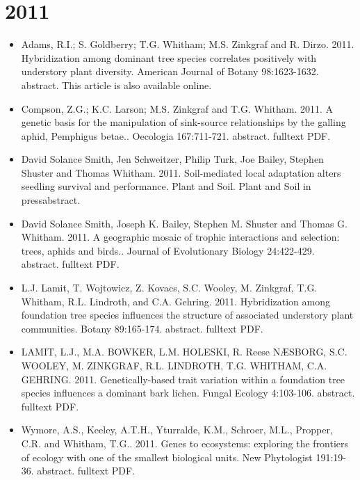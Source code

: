 \documentclass[12pt]{article}
\begin{document}
\section{2011}
\begin{itemize}
\item Adams, R.I.; S. Goldberry; T.G. Whitham; M.S. Zinkgraf and
R. Dirzo. 2011. Hybridization among dominant tree species correlates
positively with understory plant diversity. American Journal of Botany
98:1623-1632. abstract. This article is also available online.

\item Compson, Z.G.; K.C. Larson; M.S. Zinkgraf and T.G. Whitham. 2011. A
genetic basis for the manipulation of sink-source relationships by the
galling aphid, Pemphigus betae.. Oecologia
167:711-721. abstract. fulltext PDF.

\item David Solance Smith, Jen Schweitzer, Philip Turk, Joe Bailey, Stephen
Shuster and Thomas Whitham. 2011. Soil-mediated local adaptation
alters seedling survival and performance. Plant and Soil. Plant and
Soil in pressabstract.

\item David Solance Smith, Joseph K. Bailey, Stephen M. Shuster and Thomas
G. Whitham. 2011. A geographic mosaic of trophic interactions and
selection: trees, aphids and birds.. Journal of Evolutionary Biology
24:422-429. abstract. fulltext PDF.

\item L.J. Lamit, T. Wojtowicz, Z. Kovacs, S.C. Wooley, M. Zinkgraf,
T.G. Whitham, R.L. Lindroth, and C.A. Gehring. 2011. Hybridization
among foundation tree species influences the structure of associated
understory plant communities. Botany 89:165-174. abstract. fulltext
PDF.

\item LAMIT, L.J., M.A. BOWKER, L.M. HOLESKI, R. Reese NÆSBORG, S.C. WOOLEY,
M. ZINKGRAF, R.L. LINDROTH, T.G. WHITHAM,
C.A. GEHRING. 2011. Genetically-based trait variation within a
foundation tree species influences a dominant bark lichen. Fungal
Ecology 4:103-106. abstract. fulltext PDF.
 
\item Wymore, A.S., Keeley, A.T.H., Yturralde, K.M., Schroer, M.L., Propper,
C.R. and Whitham, T.G.. 2011. Genes to ecosystems: exploring the
frontiers of ecology with one of the smallest biological units. New
Phytologist 191:19-36. abstract. fulltext PDF.
\end{itemize}
\end{document}
